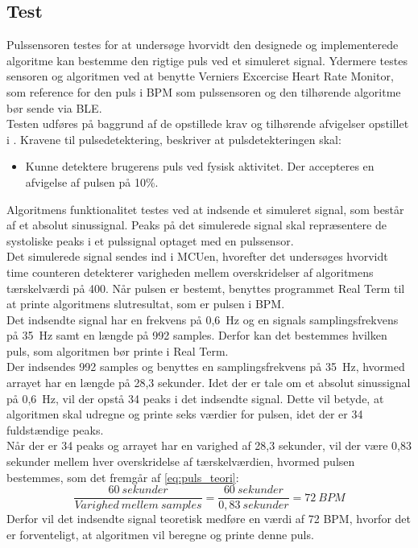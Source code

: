 \subsection{Test}
Pulssensoren testes for at undersøge hvorvidt den designede og implementerede algoritme kan bestemme den rigtige puls ved et simuleret signal. Ydermere testes sensoren og algoritmen ved at benytte Verniers Excercise Heart Rate Monitor, som reference for den puls i BPM som pulssensoren og den tilhørende algoritme bør sende via BLE. \\
Testen udføres på baggrund af de opstillede krav og tilhørende afvigelser opstillet i . Kravene til pulsedetektering, beskriver at pulsdetekteringen skal:
\begin{itemize}
	\item Kunne detektere brugerens puls ved fysisk aktivitet. Der accepteres en afvigelse af pulsen på 10\%.
\end{itemize}
Algoritmens funktionalitet testes ved at indsende et simuleret signal, som består af et absolut sinussignal. Peaks på det simulerede signal skal repræsentere de systoliske peaks i et pulssignal optaget med en pulssensor.\\
Det simulerede signal sendes ind i MCUen, hvorefter det undersøges hvorvidt time counteren detekterer varigheden mellem overskridelser af algoritmens tærskelværdi på 400. Når pulsen er bestemt, benyttes programmet Real Term til at printe algoritmens slutresultat, som er pulsen i BPM. \\
Det indsendte signal har en frekvens på 0,6~Hz og en signals samplingsfrekvens på 35~Hz samt en længde på 992 samples. Derfor kan det bestemmes hvilken puls, som algoritmen bør printe i Real Term. \\
Der indsendes 992 samples og benyttes en samplingsfrekvens på 35~Hz, hvormed arrayet har en længde på 28,3 sekunder. Idet der er tale om et absolut sinussignal på 0,6~Hz, vil der opstå 34 peaks i det indsendte signal. Dette vil betyde, at algoritmen skal udregne og printe seks værdier for pulsen, idet der er 34 fuldstændige peaks. \\
Når der er 34 peaks og arrayet har en varighed af 28,3 sekunder, vil der være 0,83 sekunder mellem hver overskridelse af tærskelværdien, hvormed pulsen bestemmes, som det fremgår af \eqref{eq:puls_teori}:
\begin{equation}
\frac{60~sekunder}{Varighed~mellem~samples} = \frac{60~sekunder}{0,83~sekunder} = 72~BPM
\label{eq:puls_teori}
\end{equation} 
Derfor vil det indsendte signal teoretisk medføre en værdi af 72 BPM, hvorfor det er forventeligt, at algoritmen vil beregne og printe denne puls.

